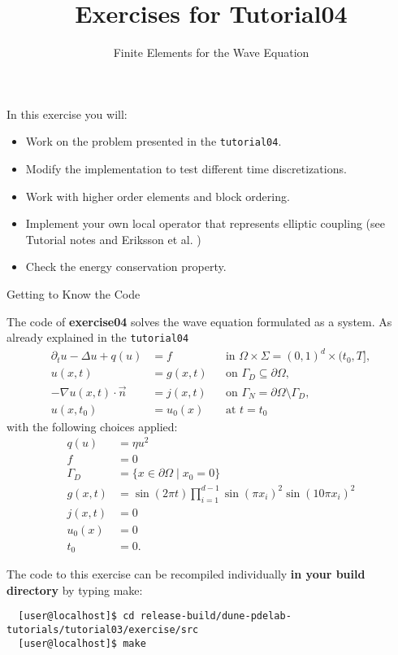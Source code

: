 \documentclass[12pt,a4paper]{article}
\title{\textbf{Exercises for Tutorial04}}
\subtitle{Finite Elements for the Wave  Equation}
\begin{document}
\exerciseheader

In this exercise you will:
\begin{itemize}
\item Work on the problem presented in the \lstinline{tutorial04}.
\item Modify the implementation to test different time discretizations. 
\item Work with higher order elements and block ordering.
\item Implement your own local operator that represents elliptic coupling (see Tutorial notes and Eriksson et al. \cite{Eriksson})
\item Check the energy conservation property.
\end{itemize}

\begin{Exercise}{Getting to Know the Code}

  \lstset{language=bash}

  The code of \textbf{exercise04} solves the wave equation formulated as a system. As already explained in the \lstinline{tutorial04}
  \begin{align}
    \partial_t u-\Delta u+q(u) &= f && \text{in }\Omega\times\Sigma =
    (0,1)^d \times (t_0, T], \\
    u(x,t) & =g(x,t) && \text{on }\Gamma_D\subseteq\partial\Omega, \\
    -\nabla u(x,t) \cdot \vec{n} &= j(x,t) &&
    \text{on }\Gamma_N=\partial\Omega\setminus\Gamma_D, \\
    u(x,t_0)&=u_0(x) && \text{at } t=t_0
  \end{align}
  with the following choices applied:
  \begin{align}
    \label{ch1:first}
    q(u) &= \eta u^2 \\
    f &= 0 \\
    \Gamma_D &= \{x \in\partial\Omega \mid x_0 = 0 \} \\
    g(x,t) &= \sin(2\pi t) \prod_{i=1}^{d-1} \sin(\pi x_i)^2
    \sin(10\pi x_i)^2\\
    j(x,t) &= 0 \\
    u_0(x) &= 0 \\
    \label{ch1:last}
    t_0&=0 .
  \end{align}

  The code to this exercise can be recompiled individually \textbf{in
    your build directory} by typing make:
  \begin{lstlisting}
  [user@localhost]$ cd release-build/dune-pdelab-tutorials/tutorial03/exercise/src
  [user@localhost]$ make
  \end{lstlisting}


\end{Exercise}
\end{document}
